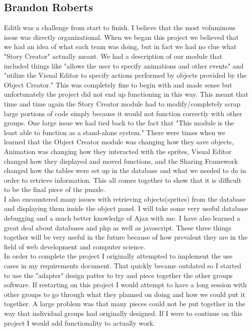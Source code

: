 \documentclass[12pt]{article}
\begin{document}
\subsection{Brandon Roberts}
Edith was a challenge from start to finish.  I believe that the most voluminous issue was directly organizational.  When we began this project we believed that we had an idea of what each team was doing, but in fact we had no clue what "Story Creator" actually meant.  We had a description of our module that included things like "allows the user to specify animations and other events" and "utilize the Visual Editor to specify actions performed by objects provided by the Object Creator."  This was completely fine to begin with and made sense but unfortunately the project did not end up functioning in this way.  This meant that time and time again the Story Creator module had to modify/completely scrap large portions of code simply because it would not function correctly with other groups.  One large issue we had tied back to the fact that "This module is the least able to function as a stand-alone system."  There were times when we learned that the Object Creator module was changing how they save objects, Animation was changing how they interacted with the sprites, Visual Editor changed how they displayed and moved functions, and the Sharing Framework changed how the tables were set up in the database and what we needed to do in order to retrieve information.  This all comes together to show that it is difficult to be the final piece of the puzzle.  \\

I also encountered many issues with retrieving objects(sprites) from the database and displaying them inside the object panel.  I will take some very useful database debugging and a much better knowledge of Ajax with me.  I have also learned a great deal about databases and php as well as javascript.  These three things together will be very useful in the future because of how prevalent they are in the field of web development and computer science. \\

In order to complete the project I originally attempted to implement the use cases in my requirements document.  That quickly became outdated so I started to use the "adapter" design patter to try and piece together the other groups software.  If restarting on this project I would attempt to have a long session with other groups to go through what they planned on doing and how we could put it together.  A large problem was that many pieces could not be put together in the way that individual groups  had originally designed.  If I were to continue on this project I would add functionality to actually work.
\end{document}
